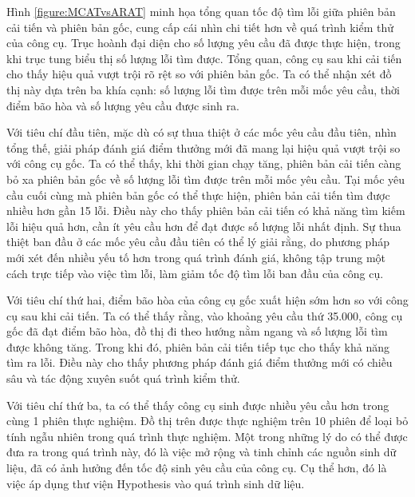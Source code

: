 
Hình \ref{figure:MCATvsARAT} minh họa tổng quan tốc độ tìm lỗi giữa phiên bản cải tiến và phiên bản gốc, cung cấp cái nhìn chi tiết hơn về quá trình kiểm thử của công cụ. Trục hoành đại diện cho số lượng yêu cầu đã được thực hiện, trong khi trục tung biểu thị số lượng lỗi tìm được. Tổng quan, công cụ sau khi cải tiến cho thấy hiệu quả vượt trội rõ rệt so với phiên bản gốc. Ta có thể nhận xét đồ thị này dựa trên ba khía cạnh: số lượng lỗi tìm được trên mỗi mốc yêu cầu, thời điểm bão hòa và số lượng yêu cầu được sinh ra.

Với tiêu chí đầu tiên, mặc dù có sự thua thiệt ở các mốc yêu cầu đầu tiên, nhìn tổng thế, giải pháp đánh giá điểm thưởng mới đã mang lại hiệu quả vượt trội so với công cụ gốc. Ta có thể thấy, khi thời gian chạy tăng, phiên bản cải tiến càng bỏ xa phiên bản gốc về số lượng lỗi tìm được trên mỗi mốc yêu cầu. Tại mốc yêu cầu cuối cùng mà phiên bản gốc có thể thực hiện, phiên bản cải tiến tìm được nhiều hơn gần 15 lỗi. Điều này cho thấy phiên bản cải tiến có khả năng tìm kiếm lỗi hiệu quả hơn, cần ít yêu cầu hơn để đạt được số lượng lỗi nhất định. Sự thua thiệt ban đầu ở các mốc yêu cầu đầu tiên có thể lý giải rằng, do phương pháp mới xét đến nhiều yếu tố hơn trong quá trình đánh giá, không tập trung một cách trực tiếp vào việc tìm lỗi, làm giảm tốc độ tìm lỗi ban đầu của công cụ.


Với tiêu chí thứ hai, điểm bão hòa của công cụ gốc xuất hiện sớm hơn so với công cụ sau khi cải tiến. Ta có thể thấy rằng, vào khoảng yêu cầu thứ 35.000, công cụ gốc đã đạt điểm bão hòa, đồ thị đi theo hướng nằm ngang và số lượng lỗi tìm được không tăng. Trong khi đó, phiên bản cải tiến tiếp tục cho thấy khả năng tìm ra lỗi. Điều này cho thấy phương pháp đánh giá điểm thưởng mới có chiều sâu và tác động xuyên suốt quá trình kiểm thử.

Với tiêu chí thứ ba, ta có thể thấy công cụ sinh được nhiều yêu cầu hơn trong cùng 1 phiên thực nghiệm. Đồ thị trên được thực nghiệm trên 10 phiên để loại bỏ tính ngẫu nhiên trong quá trình thực nghiệm. Một trong những lý do có thể được đưa ra trong quá trình này, đó là việc mở rộng và tinh chỉnh các nguồn sinh dữ liệu, đã có ảnh hưởng đến tốc độ sinh yêu cầu của công cụ. Cụ thể hơn, đó là việc áp dụng thư viện Hypothesis vào quá trình sinh dữ liệu.



